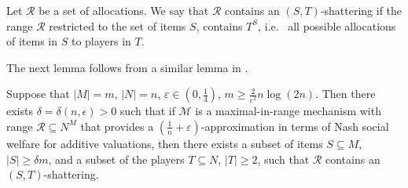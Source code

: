 \documentclass{theoretics}
\newcommand{\eps}{\varepsilon}
\newcommand{\cM}{{\mathcal M}}
\newcommand{\cR}{{\mathcal R}}
\begin{document}
\begin{definition}
Let $\cR$ be a set of allocations. We say that $\cR$ contains an $(S,T)$-shattering if the range $\cR$ restricted to the set of items $S$, contains $T^S$, i.e.~ all possible allocations of items in $S$ to players in $T$.
\end{definition}

The next lemma follows from a similar lemma in \cite{BDFK10}.

\begin{lemma}
\label{lemma:shattering}
Suppose that $|M|=m$, $|N|=n$, $\eps \in (0,\frac14)$, $m \geq \frac{2}{\eps^2} n \log (2n)$. Then there exists $\delta = \delta(n,\epsilon)>0$ such that if $\cM$ is a maximal-in-range mechanism with range $\cR \subseteq N^M$ that provides a $(\frac{1}{n} + \eps)$-approximation in terms of Nash social welfare for additive valuations, then there exists a subset of items $S\subseteq M$, $|S| \geq \delta m$, and a subset of the players $T \subseteq N$, $|T|\geq 2$, such that $\cR$ contains an $(S,T)$-shattering.
\end{lemma}
\end{document}

